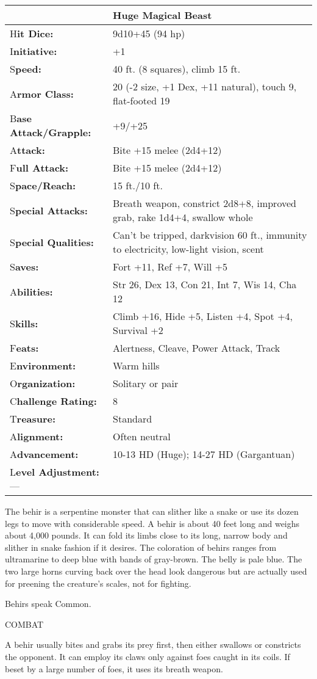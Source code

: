 \documentclass{article}
\begin{document}
\begin{tabular}{|>{\raggedright}p{91pt}|>{\raggedright}p{231pt}|}
\hline
  & Huge Magical Beast\tabularnewline
\hline
H\textbf{it Dice:} & 9d10+45 (94 hp)\tabularnewline
\hline
I\textbf{nitiative:} & +1\tabularnewline
\hline
S\textbf{peed:} & 40 ft. (8 squares), climb 15 ft.\tabularnewline
\hline
A\textbf{rmor Class:} & 20 (-2 size, +1 Dex, +11 natural), touch 9, flat-footed 
19\tabularnewline
\hline
B\textbf{ase Attack/Grapple:} & +9/+25\tabularnewline
\hline
A\textbf{ttack:} & Bite +15 melee (2d4+12)\tabularnewline
\hline
F\textbf{ull Attack:} & Bite +15 melee (2d4+12)\tabularnewline
\hline
S\textbf{pace/Reach:} & 15 ft./10 ft.\tabularnewline
\hline
S\textbf{pecial Attacks:} & Breath weapon, constrict 2d8+8, improved grab, rake 
1d4+4, swallow whole\tabularnewline
\hline
S\textbf{pecial Qualities:} & Can't be tripped, darkvision 60 ft., immunity to 
electricity, low-light vision, scent\tabularnewline
\hline
S\textbf{aves:} & Fort +11, Ref +7, Will +5\tabularnewline
\hline
A\textbf{bilities:} & Str 26, Dex 13, Con 21, Int 7, Wis 14, Cha 12\tabularnewline
\hline
S\textbf{kills:} & Climb +16, Hide +5, Listen +4, Spot +4, Survival +2\tabularnewline
\hline
F\textbf{eats:} & Alertness, Cleave, Power Attack, Track\tabularnewline
\hline
E\textbf{nvironment:} & Warm hills\tabularnewline
\hline
O\textbf{rganization:} & Solitary or pair\tabularnewline
\hline
C\textbf{hallenge Rating:} & 8\tabularnewline
\hline
T\textbf{reasure:} & Standard\tabularnewline
\hline
A\textbf{lignment:} & Often neutral\tabularnewline
\hline
A\textbf{dvancement:} & 10-13 HD (Huge); 14-27 HD (Gargantuan)\tabularnewline
\hline
L\textbf{evel Adjustment:}--- & \tabularnewline
\hline
\end{tabular}

The behir is a serpentine monster that can slither like a snake or use its dozen 
legs to move with considerable speed. A behir is about 40 feet long and weighs 
about 4,000 pounds. It can fold its limbs close to its long, narrow body and slither 
in snake fashion if it desires. The coloration of behirs ranges from ultramarine 
to deep blue with bands of gray-brown. The belly is pale blue. The two large horns 
curving back over the head look dangerous but are actually used for preening the 
creature's scales, not for fighting.

Behirs speak Common.

COMBAT

A behir usually bites and grabs its prey first, then either swallows or constricts 
the opponent. It can employ its claws only against foes caught in its coils. If 
beset by a large number of foes, it uses its breath weapon.
\end{document}
